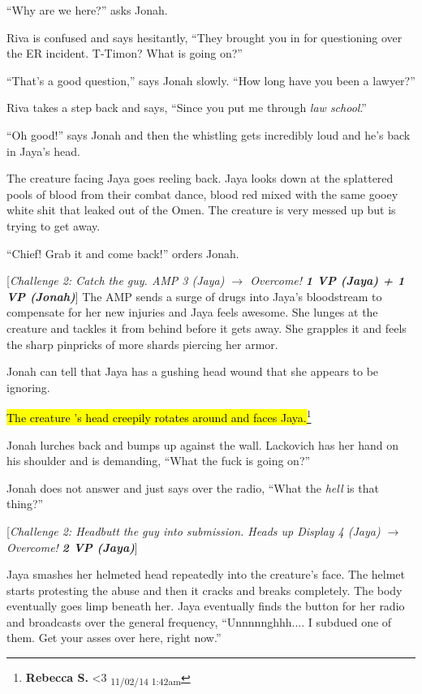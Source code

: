 ``Why are we here?'' asks Jonah.

Riva is confused and says hesitantly, ``They brought you in for questioning over the ER incident.  T-Timon?  What is going on?''

``That's a good question,'' says Jonah slowly.  ``How long have you been a lawyer?''

Riva takes a step back and says, ``Since you put me through \textit{law school}.''

``Oh good!'' says Jonah and then the whistling gets incredibly loud and he's back in Jaya's head.



The creature facing Jaya goes reeling back.  Jaya looks down at the splattered pools of blood from their combat dance, blood red mixed with the same gooey white shit that leaked out of the Omen.  The creature is very messed up but is trying to get away.

``Chief!  Grab it and come back!'' orders Jonah.

{[}\textit{Challenge 2: Catch the guy.  AMP 3 (Jaya) $\rightarrow$ Overcome! }\textit{\textbf{1 VP (Jaya) + 1 VP (Jonah)}}{]}  The AMP sends a surge of drugs into Jaya's bloodstream to compensate for her new injuries and Jaya feels awesome.  She lunges at the creature and tackles it from behind before it gets away.   She grapples it and feels the sharp pinpricks of more shards piercing her armor.  

Jonah can tell that Jaya has a gushing head wound that she appears to be ignoring.

\hl{The creature 's head creepily rotates around and faces Jaya.}\footnote{\textbf{Rebecca S. }\textless 3 \textsubscript{11/02/14 1:42am}}

Jonah lurches back and bumps up against the wall.  Lackovich has her hand on his shoulder and is demanding, ``What the fuck is going on?''

Jonah does not answer and just says over the radio, ``What the \textit{hell} is that thing?''

{[}\textit{Challenge 2: Headbutt the guy into submission.  Heads up Display 4 (Jaya) $\rightarrow$ Overcome! }\textit{\textbf{2 VP (Jaya)}}{]}

Jaya smashes her helmeted head repeatedly into the creature's face.  The helmet starts protesting the abuse and then it cracks and breaks completely. The body eventually goes limp beneath her.  Jaya eventually finds the button for her radio and broadcasts over the general frequency, ``Unnnnnghhh.... I subdued one of them.  Get your asses over here, right now.''

